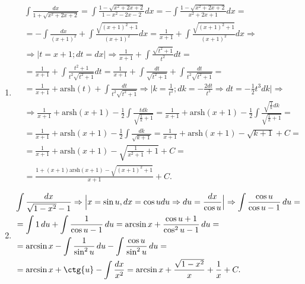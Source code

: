 \documentclass[a4paper, 12pt]{article}
\newcommand{\du}{\,du}
\begin{document}
\begin{enumerate}
  \item %
  \begin{align*}
    &\int{\frac{dx}{1+\sqrt{x^2+2x+2}}} = 
    \int{\frac{1-\sqrt{x^2+2x+2}}{1-x^2-2x-2}dx} = 
    -\int{\frac{1 - \sqrt{x^2+2x+2}}{x^2+2x+1}dx} = \\
    &= -\int{\frac{dx}{(x+1)^2}} + \int{\frac{\sqrt{(x+1)^2+1}}{(x+1)^2}dx} = 
    \frac{1}{x+1} + \int{\frac{\sqrt{(x+1)^2+1}}{(x+1)^2}dx} \Rightarrow \\
    &\Rightarrow \Big|t = x+1; dt = dx \Big| \Rightarrow 
    \frac{1}{x+1} + \int{\frac{\sqrt{t^2+1}}{t^2}dt} = \\
    &=\frac{1}{x+1} + \int{\frac{t^2+1}{t^2\sqrt{t^2+1}}dt} = 
    \frac{1}{x+1} + \int{\frac{dt}{\sqrt{t^2+1}}} + \int{\frac{dt}{t^2\sqrt{t^2+1}}} = \\
    &= \frac{1}{x+1} + \text{arsh}(t) + \int{\frac{dt}{t^2\sqrt{t^2+1}}} \Rightarrow 
    \Big| k = \frac{1}{t^2}; dk = -\frac{2dt}{t^3} \Rightarrow dt = -\frac{1}{2}t^3dk \Big| \Rightarrow \\
    &\Rightarrow \frac{1}{x+1} + \text{arsh}(x+1) -\frac{1}{2}\int{\frac{tdk}{\sqrt{\frac{1}{k}+1}}} = 
    \frac{1}{x+1} + \text{arsh}(x+1) -\frac{1}{2}\int{\frac{\sqrt{\frac{1}{k}}dk}{\sqrt{\frac{1}{k}+1}}} = \\
    &= \frac{1}{x+1} + \text{arsh}(x+1) -\frac{1}{2}\int{\frac{dk}{\sqrt{k+1}}} = 
    \frac{1}{x+1} + \text{arsh}(x+1) - \sqrt{k+1} +C = \\
    &= \frac{1}{x+1} + \text{arsh}(x+1) - \sqrt{\frac{1}{x^2+1}+1} +C = \\
    &=\frac{1+(x+1)\text{arsh}(x+1)-\sqrt{(x+1)^2+1}}{x+1}+C
   .\end{align*}
   
   \item %
   \begin{align*}
     &\int \frac{dx}{\sqrt{1-x^2}-1} \Rightarrow
     \Big| x = \sin u, dx = \cos u du \Rightarrow du = \frac{dx}{\cos u} \Big| \Rightarrow
     \int \frac{\cos{u}}{\cos{u}-1}\du = \\
     &=\int 1 \du + \int \frac{1}{\cos{u}-1}\du =
     \arcsin{x} + \frac{\cos{u}+1}{\cos^2{u}-1}\du = \\
     &=\arcsin{x} - \int \frac{1}{\sin^2{u}}\du - \int \frac{\cos{u}}{\sin^2{u}}\du = \\
     &= \arcsin{x} + \ctg{u} - \int \frac{dx}{x^2} = 
     \arcsin{x} + \frac{\sqrt{1-x^2}}{x} + \frac{1}{x} + C
    .\end{align*}
    

\end{enumerate}
\end{document}

